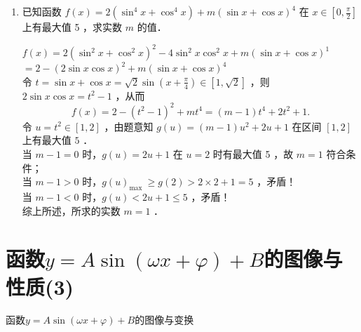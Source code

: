 \begin{enumerate}
\item 已知函数 $f(x)=2\left(\sin ^4 x+\cos ^4 x\right)+m(\sin x+\cos x)^4$ 在 $x \in\left[0, \frac{\pi}{2}\right]$ 上有最大值 5 ，求实数 $m$ 的值．
\begin{jieda}
$f(x)=2\left(\sin ^2 x+\cos ^2 x\right)^2-4 \sin ^2 x \cos ^2 x+m(\sin x+\cos x)^1$
$=2-(2 \sin x \cos x)^2+m(\sin x+\cos x)^4$ \\
令 $t=\sin x+\cos x=\sqrt{2} \sin \left(x+\frac{\pi}{4}\right) \in[1, \sqrt{2}]$ ，则 $2 \sin x \cos x=t^2-1$ ，从而
$$f(x)=2-\left(t^2-1\right)^2+m t^4=(m-1) t^4+2 t^2+1 .$$
令 $u=t^2 \in[1,2]$ ，由题意知 $g(u)=(m-1) u^2+2 u+1$ 在区间 $[1,2]$ 上有最大值 $5$ ．\\
当 $m-1=0$ 时，$g(u)=2 u+1$ 在 $u=2$ 时有最大值 5 ，故 $m=1$ 符合条件；\\
当 $m-1>0$ 时，$g(u)_{\text {max }} \geqslant g(2)>2 \times 2+1=5$ ，矛盾！\\
当 $m-1<0$ 时，$g(u)<2 u+1 \leqslant 5$ ，矛盾！\\
综上所述，所求的实数 $m=1$ ．
\end{jieda}
\end{enumerate}



\section{函数$y=A\sin(\omega{x}+\varphi)+B$的图像与性质(3)}
\zsd 函数$y=A\sin(\omega{x}+\varphi)+B$的图像与变换 \\

